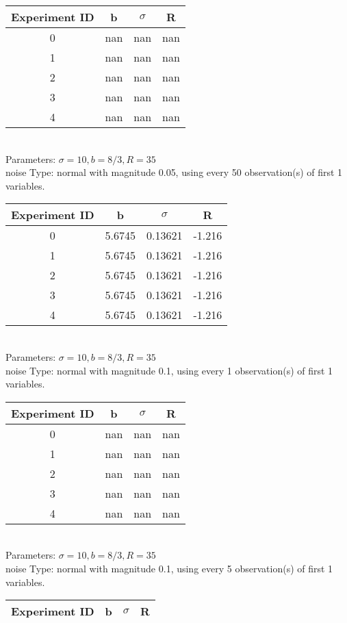 \begin{multicols}{3}
\begin{tabular}{cccc}
\hline Experiment ID & b & $\sigma$ & R \\ \hline 
0 & nan & nan & nan\\ \hline 
 1 & nan & nan & nan\\ \hline 
 2 & nan & nan & nan\\ \hline 
 3 & nan & nan & nan\\ \hline 
 4 & nan & nan & nan\\ \hline 
 \end{tabular}\\
Parameters: $\sigma=10, b=8/3, R=35$\\
noise Type: normal with magnitude 0.05, using every 50 observation(s) of first 1 variables.\\
\begin{tabular}{cccc}
\hline Experiment ID & b & $\sigma$ & R \\ \hline 
0 & 5.6745 & 0.13621 & -1.216\\ \hline 
 1 & 5.6745 & 0.13621 & -1.216\\ \hline 
 2 & 5.6745 & 0.13621 & -1.216\\ \hline 
 3 & 5.6745 & 0.13621 & -1.216\\ \hline 
 4 & 5.6745 & 0.13621 & -1.216\\ \hline 
 \end{tabular}\\
Parameters: $\sigma=10, b=8/3, R=35$\\
noise Type: normal with magnitude 0.1, using every 1 observation(s) of first 1 variables.\\
\begin{tabular}{cccc}
\hline Experiment ID & b & $\sigma$ & R \\ \hline 
0 & nan & nan & nan\\ \hline 
 1 & nan & nan & nan\\ \hline 
 2 & nan & nan & nan\\ \hline 
 3 & nan & nan & nan\\ \hline 
 4 & nan & nan & nan\\ \hline 
 \end{tabular}\\
Parameters: $\sigma=10, b=8/3, R=35$\\
noise Type: normal with magnitude 0.1, using every 5 observation(s) of first 1 variables.\\
\begin{tabular}{cccc}
\hline Experiment ID & b & $\sigma$ & R \\ \hline 

\end{tabular}
\end{multicols}
